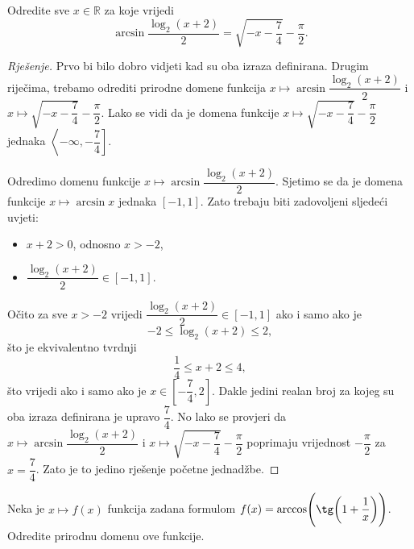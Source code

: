 \begin{exercise}
Odredite sve $x\in \mathbb{R}$ za koje vrijedi
$$\arcsin{\dfrac{\log_2(x+2)}{2}}=\sqrt{-x-\dfrac{7}{4}}-\dfrac{\pi}{2}.$$
\end{exercise}
\begin{proof}[Rješenje]
Prvo bi bilo dobro vidjeti kad su oba izraza definirana. Drugim riječima, trebamo odrediti prirodne domene funkcija $x\mapsto \arcsin{\dfrac{\log_2(x+2)}{2}}$ i $x\mapsto \sqrt{-x-\dfrac{7}{4}}-\dfrac{\pi}{2}$. Lako se vidi da je domena funkcije $x\mapsto \sqrt{-x-\dfrac{7}{4}}-\dfrac{\pi}{2}$ jednaka $\left\langle -\infty, -\dfrac{7}{4}\right]$.

Odredimo domenu funkcije $x\mapsto \arcsin{\dfrac{\log_2(x+2)}{2}}$. Sjetimo se da je domena funkcije $x\mapsto \arcsin{x}$ jednaka $[-1, 1]$. Zato trebaju biti zadovoljeni sljedeći uvjeti:
\begin{itemize}
\item $x+2>0$, odnosno $x>-2$,
\item $\dfrac{\log_2(x+2)}{2}\in [-1, 1]$.
\end{itemize}
Očito za sve $x>-2$ vrijedi $\dfrac{\log_2(x+2)}{2}\in [-1, 1]$ ako i samo ako je
$$-2\leq \log_2(x+2)\leq 2,$$
što je ekvivalentno tvrdnji
$$\dfrac{1}{4}\leq x+2\leq 4,$$
što vrijedi ako i samo ako je $x\in \left[-\dfrac{7}{4}, 2\right]$. Dakle jedini realan broj za kojeg su oba izraza definirana je upravo $\dfrac{7}{4}$. No lako se provjeri da $x\mapsto \arcsin{\dfrac{\log_2(x+2)}{2}}$ i $x\mapsto \sqrt{-x-\dfrac{7}{4}}-\dfrac{\pi}{2}$ poprimaju vrijednost $-\dfrac{\pi}{2}$ za $x=\dfrac{7}{4}$. Zato je to jedino rješenje početne jednadžbe.
\end{proof}
\begin{exercise}
Neka je $x\mapsto f(x)$ funkcija zadana formulom $f(x)=\arccos\left(\tg\left(1+\dfrac{1}{x}\right)\right)$. Odredite prirodnu domenu ove funkcije.
\end{exercise}
